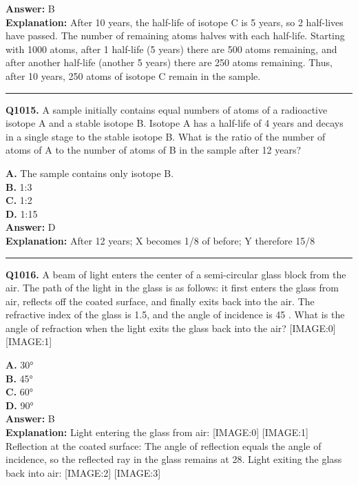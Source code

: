 \documentclass[12pt]{article}
\begin{document}
\textbf{Answer:} B \\
\textbf{Explanation:} After 10 years, the half-life of isotope C is 5 years, so 2 half-lives have passed.
The number of remaining atoms halves with each half-life.
Starting with 1000 atoms, after 1 half-life (5 years) there are 500 atoms remaining, and after another half-life (another 5 years) there are 250 atoms remaining.
Thus, after 10 years, 250 atoms of isotope C remain in the sample.

\hrule
\vspace{1em}


\noindent
\textbf{Q1015.} A sample initially contains equal numbers of atoms of a radioactive isotope A and a stable isotope B. Isotope A has a half-life of 4 years and decays in a single stage to the stable isotope B. What is the ratio of the number of atoms of A to the number of atoms of B in the sample after 12 years?



\textbf{A.} The sample contains only isotope B. \\
\textbf{B.} 1:3 \\
\textbf{C.} 1:2 \\
\textbf{D.} 1:15 \\

\textbf{Answer:} D \\
\textbf{Explanation:} After 12 years; X becomes 1/8 of before; Y therefore 15/8

\hrule
\vspace{1em}


\noindent
\textbf{Q1016.} A beam of light enters the center of a semi-circular glass block from the air. The path of the light in the glass is as follows: it first enters the glass from air, reflects off the coated surface, and finally exits back into the air. The refractive index of the glass is 1.5, and the angle of incidence is 45
\circ 
. What is the angle of refraction when the light exits the glass back into the air?
[IMAGE:0]
[IMAGE:1]



\textbf{A.} 30° \\
\textbf{B.} 45° \\
\textbf{C.} 60° \\
\textbf{D.} 90° \\

\textbf{Answer:} B \\
\textbf{Explanation:} Light entering the glass from air:
[IMAGE:0]
[IMAGE:1]
Reflection at the coated surface:
The angle of reflection equals the angle of incidence, so the reflected ray in the glass remains at 28\circ .
Light exiting the glass back into air:
[IMAGE:2]
[IMAGE:3]
\end{document}
